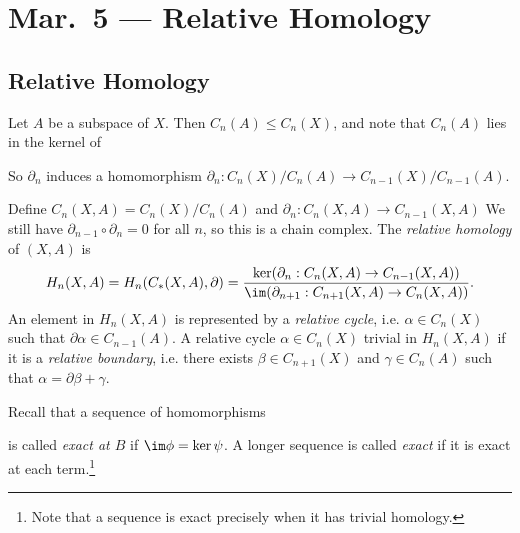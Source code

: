 \chapter{Mar.~5 --- Relative Homology}

\section{Relative Homology}
\begin{remark}
  Let $A$ be a subspace of $X$. Then $C_n(A) \le C_n(X)$,
  and note that $C_n(A)$ lies in the kernel of
  \begin{center}
  \end{center}
  So $\partial_n$ induces a homomorphism
  $\partial_n : C_n(X) / C_n(A) \to C_{n - 1}(X) / C_{n - 1}(A)$.
\end{remark}

\begin{definition}
  Define $C_n(X, A) = C_n(X) / C_n(A)$ and
  $\partial_n : C_n(X, A) \to C_{n - 1}(X, A)$
  We still have $\partial_{n - 1} \circ \partial_n = 0$
  for all $n$, so this is a chain complex.
  The \emph{relative homology} of $(X, A)$ is
  \[
    H_n(X, A)
    = H_n(C_*(X, A), \partial)
    = \frac{\ker(\partial_n : C_n(X, A) \to C_{n - 1}(X, A))}{\im(\partial_{n + 1} : C_{n + 1}(X, A) \to C_{n}(X, A))}.
  \]
  An element in $H_n(X, A)$ is represented by a
  \emph{relative cycle}, i.e. $\alpha \in C_n(X)$
  such that $\partial \alpha \in C_{n - 1}(A)$.
  A relative cycle $\alpha \in C_n(X)$ trivial
  in $H_n(X, A)$ if it is a \emph{relative boundary},
  i.e. there exists $\beta \in C_{n + 1}(X)$
  and $\gamma \in C_n(A)$ such that
  $\alpha = \partial \beta + \gamma$.
\end{definition}

\begin{definition}
  Recall that a sequence of homomorphisms
  \begin{center}
  \end{center}
  is called \emph{exact at $B$} if
  $\im \phi = \ker \psi$. A longer sequence is called
  \emph{exact} if it is exact at each term.\footnote{Note that a sequence is exact precisely when it has trivial homology.}
\end{definition}

